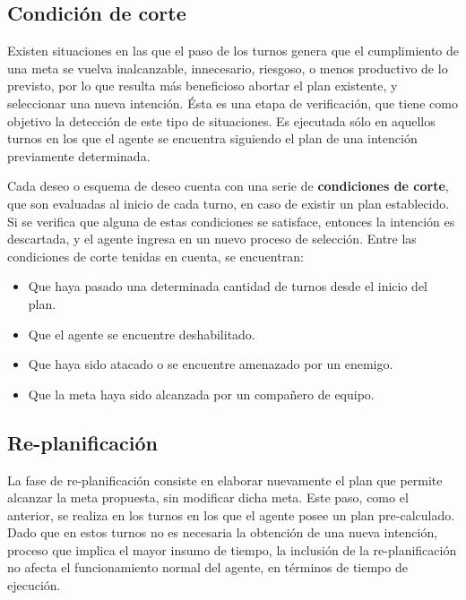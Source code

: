 \documentclass[oneside]{book}
\theoremstyle{definition}
\begin{document}
\subsection{Condición de corte}

\label{sec:condicionDeCorte}

Existen situaciones en las que el paso de los turnos genera que el cumplimiento de una 
meta se vuelva inalcanzable, innecesario, riesgoso, o menos productivo de lo previsto, por 
lo que resulta más beneficioso abortar el plan existente, y seleccionar una nueva intención. 
Ésta es una etapa de verificación, que tiene como objetivo la detección de este tipo de 
situaciones. Es ejecutada sólo en aquellos turnos en los que el agente se encuentra 
siguiendo el plan de una intención previamente determinada.

Cada deseo o esquema de deseo cuenta con una serie de \textbf{condiciones de corte}, que 
son evaluadas al inicio de cada turno, en caso de existir un plan establecido. Si se verifica 
que alguna de estas condiciones se satisface, entonces la intención es descartada, y el 
agente ingresa en un nuevo proceso de selección. 
Entre las condiciones de corte tenidas en cuenta, se encuentran: 

\begin{itemize}
	\item Que haya pasado una determinada cantidad de turnos desde el inicio del plan.
	\item Que el agente se encuentre deshabilitado.
	\item Que haya sido atacado o se encuentre amenazado por un enemigo.
	\item Que la meta haya sido alcanzada por un compañero de equipo.
\end{itemize}

\subsection{Re-planificación}

La fase de re-planificación consiste en elaborar nuevamente el plan que permite alcanzar 
la meta propuesta, sin modificar dicha meta. Este paso, como el anterior, se realiza en 
los turnos en los que el agente posee un plan pre-calculado. Dado que en estos turnos no 
es necesaria la obtención de una nueva intención, proceso que implica el mayor insumo de 
tiempo, la inclusión de la re-planificación no afecta el funcionamiento normal del agente, 
en términos de tiempo de ejecución. 
\end{document}
